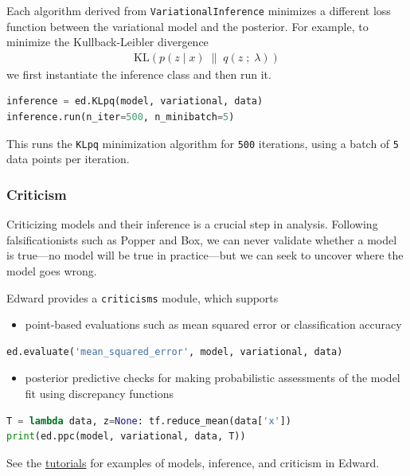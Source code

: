 Each algorithm derived from \texttt{VariationalInference} minimizes a
different loss function between the variational model and the
posterior.
For example, to minimize the Kullback-Leibler divergence
\begin{align*}
  \text{KL}(p(z \mid x) \;\|\; q(z \;;\; \lambda))
\end{align*}
we first instantiate the inference class and then run it.
\begin{lstlisting}[language=Python]
inference = ed.KLpq(model, variational, data)
inference.run(n_iter=500, n_minibatch=5)
\end{lstlisting}
This runs the \texttt{KLpq} minimization algorithm for \texttt{500} iterations,
using a batch of \texttt{5} data points per iteration.

\subsubsection{Criticism}\label{criticism}

Criticizing models and their inference is a crucial step in analysis.
Following
falsificationists such as Popper and Box, we can never validate
whether a model is true---no model will be true in practice---but we
can seek to uncover where the model goes wrong.

Edward provides a \texttt{criticisms} module, which supports
\begin{itemize}
  \item point-based evaluations such as mean squared error or
  classification accuracy
\end{itemize}
\begin{lstlisting}[language=Python]
ed.evaluate('mean_squared_error', model, variational, data)
\end{lstlisting}
\begin{itemize}
  \item posterior predictive checks for making probabilistic
  assessments of the model fit using discrepancy functions
\end{itemize}
\begin{lstlisting}[language=Python]
T = lambda data, z=None: tf.reduce_mean(data['x'])
print(ed.ppc(model, variational, data, T))
\end{lstlisting}

See the \href{tutorials.html}{tutorials} for examples of models,
inference, and criticism in Edward.


